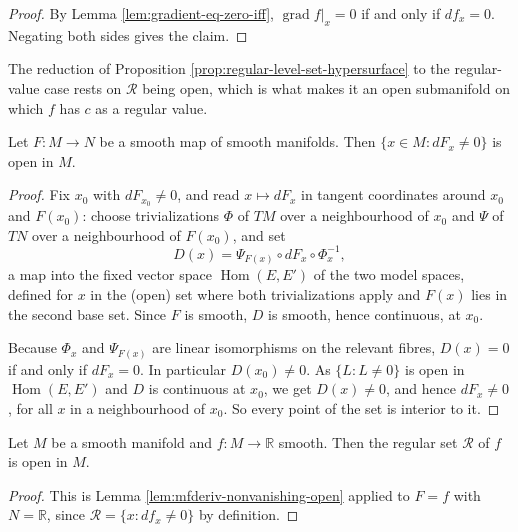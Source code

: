 \begin{proof}
\leanok
{}
By Lemma \ref{lem:gradient-eq-zero-iff}, $\operatorname{grad} f|_x = 0$ if and only if $df_x = 0$. Negating both sides gives the claim.
\end{proof}

The reduction of Proposition \ref{prop:regular-level-set-hypersurface} to the regular-value case rests on $\mathcal{R}$ being open, which is what makes it an open submanifold on which $f$ has $c$ as a regular value.

\begin{lemma}
\label{lem:mfderiv-nonvanishing-open}
\leanok
Let $F : M \to N$ be a smooth map of smooth manifolds. Then $\{x \in M : dF_x \neq 0\}$ is open in $M$.
\end{lemma}

\begin{proof}
\leanok
Fix $x_0$ with $dF_{x_0} \neq 0$, and read $x \mapsto dF_x$ in tangent coordinates around $x_0$ and $F(x_0)$: choose trivializations $\Phi$ of $TM$ over a neighbourhood of $x_0$ and $\Psi$ of $TN$ over a neighbourhood of $F(x_0)$, and set
\[
  D(x) = \Psi_{F(x)} \circ dF_x \circ \Phi_x^{-1},
\]
a map into the fixed vector space $\operatorname{Hom}(E, E')$ of the two model spaces, defined for $x$ in the (open) set where both trivializations apply and $F(x)$ lies in the second base set. Since $F$ is smooth, $D$ is smooth, hence continuous, at $x_0$.

Because $\Phi_x$ and $\Psi_{F(x)}$ are linear isomorphisms on the relevant fibres, $D(x) = 0$ if and only if $dF_x = 0$. In particular $D(x_0) \neq 0$. As $\{L : L \neq 0\}$ is open in $\operatorname{Hom}(E,E')$ and $D$ is continuous at $x_0$, we get $D(x) \neq 0$, and hence $dF_x \neq 0$, for all $x$ in a neighbourhood of $x_0$. So every point of the set is interior to it.
\end{proof}

\begin{lemma}
\label{lem:regular-set-open}
\leanok
{}
Let $M$ be a smooth manifold and $f : M \to \mathbb{R}$ smooth. Then the regular set $\mathcal{R}$ of $f$ is open in $M$.
\end{lemma}

\begin{proof}
\leanok
{}
This is Lemma \ref{lem:mfderiv-nonvanishing-open} applied to $F = f$ with $N = \mathbb{R}$, since $\mathcal{R} = \{x : df_x \neq 0\}$ by definition.
\end{proof}

